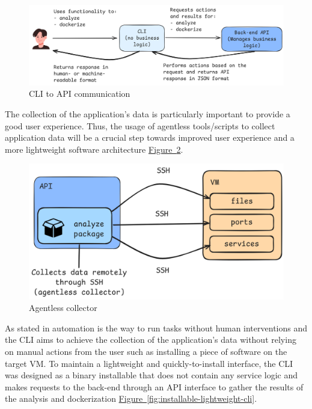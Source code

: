 \documentclass{article}
\newcommand{\FigRef}[1]{\hyperref[#1]{Figure~\ref{#1}}}
\begin{document}
\begin{multicols}{2}
\begin{figure}[H]
    \centering
    \includegraphics[width=\linewidth]{images/cli-api-communication.png}
    \caption{CLI to API communication}
    \label{fig:cli-api-communication}
\end{figure}

The collection of the application’s data is particularly important to provide a good user experience. Thus, the usage of agentless tools/scripts to collect application data will be a crucial step towards improved user experience and a more lightweight software architecture \FigRef{fig:agentless-collector}.

\begin{figure}[H]
    \centering
    \includegraphics[width=\linewidth]{images/agentless-collector.png}
    \caption{Agentless collector}
    \label{fig:agentless-collector}
\end{figure}

As stated in \cite{Elradi-2023} automation is the way to run tasks without human interventions and the CLI aims to achieve the collection of the application’s data without relying on manual actions from the user such as installing a piece of software on the target VM. To maintain a lightweight and quickly-to-install interface, the CLI was designed as a binary installable that does not contain any service logic and makes requests to the back-end through an API interface to gather the results of the analysis and dockerization \FigRef{fig:installable-lightweight-cli}. 


\end{multicols}
\end{document}
